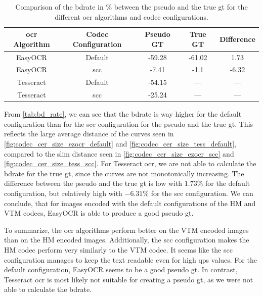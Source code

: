 \begin{table}
    \centering
    \begin{tabular}{|cc|cc|c|}
        \hline
        \gls{ocr} Algorithm & Codec Configuration & Pseudo GT & True GT & Difference \\
        \hline
        \hline
        EasyOCR & Default & -59.28 & -61.02 & 1.73 \\
        EasyOCR & \gls{scc} & -7.41 & -1.1 & -6.32 \\
        \hline
        Tesseract & Default & -54.15 & --- & --- \\
        Tesseract & \gls{scc} & -25.24 & --- & --- \\
        \hline
    \end{tabular}
    \caption{Comparison of the \gls{bdrate} in \% between the pseudo and the true \gls{gt} for the different \gls{ocr} algorithms and codec configurations.}
    \label{tab:bd_rate}
\end{table}
From \autoref{tab:bd_rate}, we can see that the \gls{bdrate} is way higher for the default configuration than for the \gls{scc} configuration for the pseudo and the true \gls{gt}.
This reflects the large average distance of the curves seen in \autoref{fig:codec_cer_size_ezocr_default} and \autoref{fig:codec_cer_size_tess_default}, compared to the slim distance seen in \autoref{fig:codec_cer_size_ezocr_scc} and \autoref{fig:codec_cer_size_tess_scc}.
For Tesseract \gls{ocr}, we are not able to calculate the \gls{bdrate} for the true \gls{gt}, since the curves are not monotonically increasing.
The difference between the pseudo and the true \gls{gt} is low with $1.73\%$ for the default configuration, but relatively high with $-6.31\%$ for the \gls{scc} configuration.
We can conclude, that for images encoded with the default configurations of the HM and VTM codecs, EasyOCR is able to produce a good pseudo \gls{gt}.

To summarize, the \gls{ocr} algorithms perform better on the VTM encoded images than on the HM encoded images.
Additionally, the \gls{scc} configuration makes the HM codec perform very similarly to the VTM codec.
It seems like the \gls{scc} configuration manages to keep the text readable even for high \glspl{qp} values.
For the default configuration, EasyOCR seems to be a good pseudo \gls{gt}.
In contrast, Tesseract \gls{ocr} is most likely not suitable for creating a pseudo \gls{gt}, as we were not able to calculate the \gls{bdrate}.
